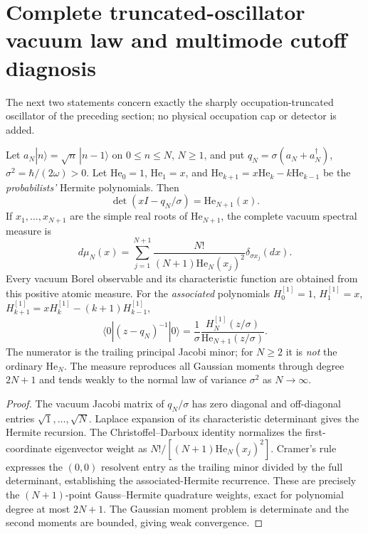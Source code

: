 \documentclass[12pt,a4paper]{article}
\begin{document}
\clearpage
\section{Complete truncated-oscillator vacuum law and multimode cutoff diagnosis}
\label{p4c:sec:v349-hermite-vacuum-law}
The next two statements concern exactly the sharply
occupation-truncated oscillator of the preceding section;
no physical occupation cap or detector is added.

\begin{theorem}
\label{p4c:thm:v349-hermite-vacuum-law}
Let $a_N|n\rangle=\sqrt n\,|n-1\rangle$ on
$0\leq n\leq N$, $N\ge1$, and put
$q_N=\sigma(a_N+a_N^\dagger)$,
$\sigma^2=\hbar/(2\omega)>0$.
Let $\mathrm{He}_0=1$, $\mathrm{He}_1=x$, and
$\mathrm{He}_{k+1}=x\mathrm{He}_k-k\mathrm{He}_{k-1}$
be the \emph{probabilists'} Hermite polynomials.  Then
\[
 \det(xI-q_N/\sigma)=\mathrm{He}_{N+1}(x).
\]
If $x_1,\ldots,x_{N+1}$ are the simple real roots of
$\mathrm{He}_{N+1}$, the complete vacuum spectral measure is
\[
 d\mu_N(x)=\sum_{j=1}^{N+1}
 \frac{N!}{(N+1)\mathrm{He}_N(x_j)^2}
 \delta_{\sigma x_j}(dx).
\]
Every vacuum Borel observable and its characteristic function
are obtained from this positive atomic measure.  For the
\emph{associated} polynomials $H_0^{[1]}=1$, $H_1^{[1]}=x$,
$H_{k+1}^{[1]}=xH_k^{[1]}-(k+1)H_{k-1}^{[1]}$,
\[
 \langle0|(z-q_N)^{-1}|0\rangle
 =\frac1\sigma\frac{H_N^{[1]}(z/\sigma)}
 {\mathrm{He}_{N+1}(z/\sigma)}.
\]
The numerator is the trailing principal Jacobi minor;
for $N\ge2$ it is \emph{not} the ordinary $\mathrm{He}_N$.
The measure reproduces all Gaussian moments through degree
$2N+1$ and tends weakly to the normal law of variance
$\sigma^2$ as $N\to\infty$.
\end{theorem}
\begin{proof}
The vacuum Jacobi matrix of $q_N/\sigma$ has zero diagonal
and off-diagonal entries $\sqrt1,\ldots,\sqrt N$.
Laplace expansion of its characteristic determinant gives the
Hermite recursion.  The Christoffel--Darboux identity
normalizes the first-coordinate eigenvector weight as
$N!/[(N+1)\mathrm{He}_N(x_j)^2]$.
Cramer's rule expresses the $(0,0)$ resolvent entry as the
trailing minor divided by the full determinant, establishing
the associated-Hermite recurrence.  These are precisely the
$(N+1)$-point Gauss--Hermite quadrature weights, exact for
polynomial degree at most $2N+1$.  The Gaussian moment problem
is determinate and the second moments are bounded, giving
weak convergence.
\end{proof}
\end{document}
